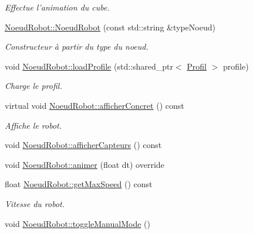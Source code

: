 \begin{DoxyCompactItemize}
\begin{DoxyCompactList}\small\item\em Effectue l'animation du cube. \end{DoxyCompactList}\item 
\hyperlink{group__inf2990_ga147453ac7f72970d7d9bfe336998ad94}{Noeud\-Robot\-::\-Noeud\-Robot} (const std\-::string \&type\-Noeud)
\begin{DoxyCompactList}\small\item\em Constructeur à partir du type du noeud. \end{DoxyCompactList}\item 
void \hyperlink{group__inf2990_ga3f0e1360264e6ac80d410adbfd424cad}{Noeud\-Robot\-::load\-Profile} (std\-::shared\-\_\-ptr$<$ \hyperlink{struct_profil}{Profil} $>$ profile)
\begin{DoxyCompactList}\small\item\em Charge le profil. \end{DoxyCompactList}\item 
virtual void \hyperlink{group__inf2990_gad63a8e09cc5ca8cc349f35e0901474e2}{Noeud\-Robot\-::afficher\-Concret} () const 
\begin{DoxyCompactList}\small\item\em Affiche le robot. \end{DoxyCompactList}\item 
void \hyperlink{group__inf2990_gacb5fe63e88cf810f3ecb584342f51c15}{Noeud\-Robot\-::afficher\-Capteurs} () const 
\item 
void \hyperlink{group__inf2990_ga20dbf7ef2ab44f32a5940e2bb76db5d0}{Noeud\-Robot\-::animer} (float dt) override
\item 
float \hyperlink{group__inf2990_ga994999022785e6186d60f9b219d6d832}{Noeud\-Robot\-::get\-Max\-Speed} () const 
\begin{DoxyCompactList}\small\item\em Vitesse du robot. \end{DoxyCompactList}\item 
\hypertarget{group__inf2990_ga7b2f749d78882a3ef67814b9e1659135}{void \hyperlink{group__inf2990_ga7b2f749d78882a3ef67814b9e1659135}{Noeud\-Robot\-::toggle\-Manual\-Mode} ()}\label{group__inf2990_ga7b2f749d78882a3ef67814b9e1659135}


\end{DoxyCompactItemize}
